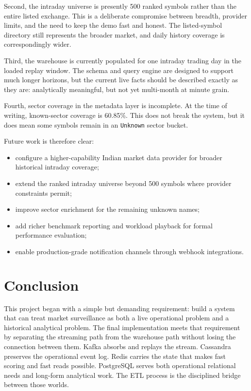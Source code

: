 \documentclass[11pt,a4paper]{article}
\begin{document}
Second, the intraday universe is presently 500 ranked symbols rather than the entire listed exchange. This is a deliberate compromise between breadth, provider limits, and the need to keep the demo fast and honest. The listed-symbol directory still represents the broader market, and daily history coverage is correspondingly wider.

Third, the warehouse is currently populated for one intraday trading day in the loaded replay window. The schema and query engine are designed to support much longer horizons, but the current live facts should be described exactly as they are: analytically meaningful, but not yet multi-month at minute grain.

Fourth, sector coverage in the metadata layer is incomplete. At the time of writing, known-sector coverage is 60.85\%. This does not break the system, but it does mean some symbols remain in an \texttt{Unknown} sector bucket.

Future work is therefore clear:
\begin{itemize}
    \item configure a higher-capability Indian market data provider for broader historical intraday coverage;
    \item extend the ranked intraday universe beyond 500 symbols where provider constraints permit;
    \item improve sector enrichment for the remaining unknown names;
    \item add richer benchmark reporting and workload playback for formal performance evaluation;
    \item enable production-grade notification channels through webhook integrations.
\end{itemize}

\section{Conclusion}
This project began with a simple but demanding requirement: build a system that can treat market surveillance as both a live operational problem and a historical analytical problem. The final implementation meets that requirement by separating the streaming path from the warehouse path without losing the connection between them. Kafka absorbs and replays the stream. Cassandra preserves the operational event log. Redis carries the state that makes fast scoring and fast reads possible. PostgreSQL serves both operational relational needs and long-form analytical work. The ETL process is the disciplined bridge between those worlds.
\end{document}
